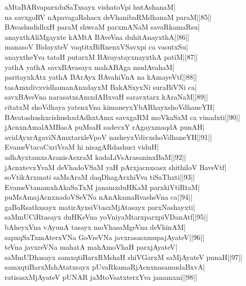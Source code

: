 \documentclass{article}
\begin{document}
aMtaBARvaparxduSaTxsayx vishatoVpi hutAshanaM|\\
na savxgoRV nApavagaRshacx deVhanibaRMdhanaM paraM||85||\\
BAvashudidhxH paraM shwcaM parxmANaM savaRkamaRsu|\\
anayxthAliMgayxte kAMtA BAveVna duhitAnayxthA||86||\\
manasoV BidayxteV vaqtitxBiRnenxVSavxpi ca vasutxSu|\\
anayxtheYva tataH putarxM BAvayatayxnayxthA patiM||87||\\
yathA yathA savxBAvasayx mahABAga mudAvahaM|\\
paritayxkAtx yathA BArAyx BAvahiVnA na kAmayeVtf||88||\\
tasAmxdivxvidhamanAnxdayxM BakASxyxNi suraBiVNi ca|\\
savxBAveVna narasatxsAmxdABxvaH saravxtarx kAraNaM||89||\\
citatxM shoVdhaya yatenxVna kimaneyxYbARhayxshoVdhaneYH|\\
BAvatashushxcishushxdAdhxtAmx savxgaRM moVkaSxM ca vinadxti||90||\\
jAcnxnAmalAMBasA puMsaH sadevxY rAgayxmaqdA punAH|\\
avidAyxrAgaviNAmxtarxleVpoV nasheyxVdivxshoVdhaneYH||91||\\
EvameVtacaCxriVraM hi nisagARdashuci viduH|\\
adhAyxtamxsAranisAsxraM kadaLiVsArasaninxBaM||92||\\
jAcnxtevxYvaM deVhadoVSaM yaH pArxjacnxsasx shithiloV BaveVtf|\\
soVtikArxmati saMsAraM daqDhagArxhiVva tiSaThxti||93||\\
EvameVtanamxhAkaSaTxM janamxduHKaM parxkiVtiRtaM|\\
puMsAmajAcnxnadoVSeVNa nAnAkamaRvasheVna ca||94||\\
gaBaRsathxsayx matirAyxsiVtasxMjAtasayx parxNashayxti|\\
saMmUCiRtasayx duHKeVna yoVniyaMtarxparxpiVDanAtf||95||\\
bAheyxVna vAyunA tasayx moVhasaMgeVna deVhinAM|\\
sapxqSaTxmAterxVNa GoVreVNa javxrasasxmupajAyateV||96||\\
teVna javxreVNa mahatA mahAmoVhaH parxjAyateV|\\
saMmUDhasayx samxqtiBarxRMshaH shiVGarxM saMjAyateV punaH||97||\\
samxqtiBarxMshAtatxsayx pUvaRkamaRjAcnxnasamudaBxvA|\\
ratisasxMjAyateV pUNAR jaMtoVsatxterxYva janamxni||98||\\
\end{document}
